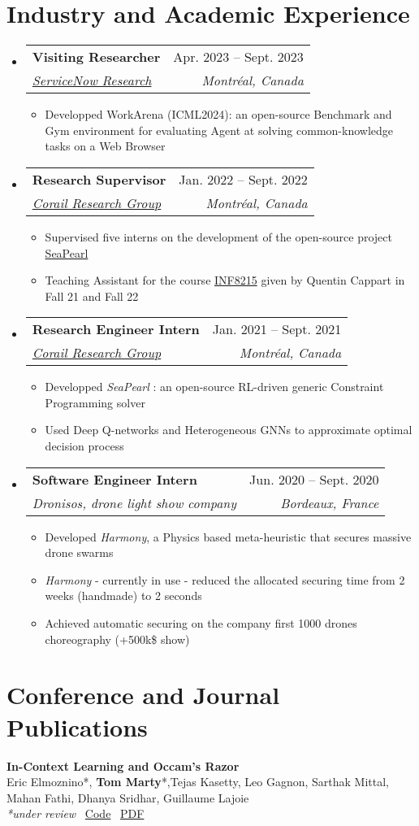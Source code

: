 \documentclass[letterpaper,11pt]{article}
\makeatletter
\newcommand{\resumeItem}[1]{
  \item\small{
    {#1 \vspace{-2pt}}
  }
}
\newcommand{\resumeSubheading}[4]{
  \vspace{-2pt}\item
    \begin{tabular*}{0.97\textwidth}[t]{l@{\extracolsep{\fill}}r}
      \textbf{#1} & #2 \\
      \textit{\small#3} & \textit{\small #4} \\
    \end{tabular*}\vspace{-7pt}
}
\newcommand{\resumeSubHeadingListStart}{\begin{itemize}[leftmargin=0.15in, label={}]}
\newcommand{\resumeSubHeadingListEnd}{\end{itemize}}
\newcommand{\resumeItemListStart}{\begin{itemize}}
\newcommand{\resumeItemListEnd}{\end{itemize}\vspace{-5pt}}
\makeatother
\begin{document}
\section{Industry and Academic Experience}
  \resumeSubHeadingListStart
      \resumeSubheading
      {Visiting Researcher}{Apr. 2023 -- Sept. 2023}
      {\href{https://corail-research.github.io/}{ServiceNow Research}}{Montréal, Canada}
    \resumeItemListStart
        \resumeItem{Developped WorkArena (ICML2024): an open-source Benchmark and Gym environment for evaluating Agent at solving common-knowledge tasks on a Web Browser}
      \resumeItemListEnd
      \resumeSubheading
      {Research Supervisor}{Jan. 2022 -- Sept. 2022}
      {\href{https://corail-research.github.io/}{Corail Research Group}}{Montréal, Canada}
    \resumeItemListStart
        \resumeItem{Supervised five interns on the development of the open-source project \href{https://github.com/corail-research/SeaPearl.jl}{SeaPearl}}
        \resumeItem{Teaching Assistant for the course \href{https://www.polymtl.ca/programmes/cours/intelligence-artif-methodes-et-algorithmes}{INF8215} given by Quentin Cappart in Fall 21 and Fall 22 }
      \resumeItemListEnd
    \resumeSubheading
      {Research Engineer Intern}{Jan. 2021 -- Sept. 2021}
      {\href{https://corail-research.github.io/}{Corail Research Group}}{Montréal, Canada}
    \resumeItemListStart
        \resumeItem{Developped {\textit{SeaPearl}} : an open-source RL-driven generic Constraint Programming solver}
        \resumeItem{Used Deep Q-networks and Heterogeneous GNNs to approximate optimal decision process}
    \resumeItemListEnd
    \resumeSubheading
      {Software Engineer Intern}{Jun. 2020 -- Sept. 2020}
      {Dronisos, drone light show company}{Bordeaux, France}
      \resumeItemListStart
        \resumeItem{Developed \textit{Harmony}, a Physics based meta-heuristic that secures massive drone swarms }
                \resumeItem{\textit{Harmony} - currently in use - reduced the allocated securing time from 2 weeks (handmade) to 2 seconds}
        \resumeItem{Achieved automatic securing on the company first 1000 drones choreography (+500k\$ show)}
      \resumeItemListEnd
    
  \resumeSubHeadingListEnd


\section{Conference and Journal Publications}
\begin{tcolorbox}[enhanced, rounded corners, colback=white, colframe=black!10!white, boxrule=0.5mm, left=10pt, right=10pt, top=6pt, bottom=3pt]
    \textbf{In-Context Learning and Occam's Razor} \\
    Eric Elmoznino*, \textbf{Tom Marty}*,Tejas Kasetty, Leo Gagnon, Sarthak Mittal, Mahan Fathi, Dhanya Sridhar, Guillaume Lajoie \\
    \textit{*under review} \hfill  \faCode  \, \href{https://github.com/3rdCore/PrequentialCode}{Code} \quad
    \faFilePdf \, \href{https://arxiv.org/abs/2410.14086}{PDF}
\end{tcolorbox}
\end{document}
